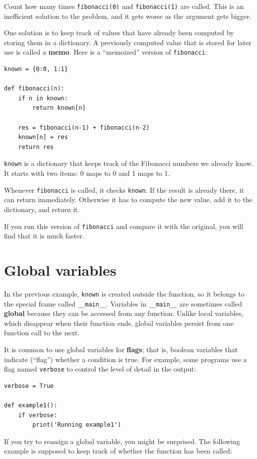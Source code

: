 \documentclass[10pt]{book}
\begin{document}
Count how many times {\tt fibonacci(0)} and {\tt fibonacci(1)} are
called.  This is an inefficient solution to the problem, and it gets
worse as the argument gets bigger.

One solution is to keep track of values that have already been
computed by storing them in a dictionary.  A previously computed value
that is stored for later use is called a {\bf memo}.  Here is a
``memoized'' version of {\tt fibonacci}:

\begin{verbatim}
known = {0:0, 1:1}

def fibonacci(n):
    if n in known:
        return known[n]

    res = fibonacci(n-1) + fibonacci(n-2)
    known[n] = res
    return res
\end{verbatim}
%
{\tt known} is a dictionary that keeps track of the Fibonacci
numbers we already know.  It starts with
two items: 0 maps to 0 and 1 maps to 1.

Whenever {\tt fibonacci} is called, it checks {\tt known}.
If the result is already there, it can return
immediately.  Otherwise it has to 
compute the new value, add it to the dictionary, and return it.

If you run this version of {\tt fibonacci} and compare it with
the original, you will find that it is much faster.



\section{Global variables}

In the previous example, {\tt known} is created outside the function,
so it belongs to the special frame called \verb"__main__".
Variables in \verb"__main__" are sometimes called {\bf global}
because they can be accessed from any function.  Unlike local
variables, which disappear when their function ends, global variables
persist from one function call to the next.

It is common to use global variables for {\bf flags}; that is, 
boolean variables that indicate (``flag'') whether a condition
is true.  For example, some programs use
a flag named {\tt verbose} to control the level of detail in the
output:

\begin{verbatim}
verbose = True

def example1():
    if verbose:
        print('Running example1')
\end{verbatim}
%
If you try to reassign a global variable, you might be surprised.
The following example is supposed to keep track of whether the
function has been called:
\end{document}
